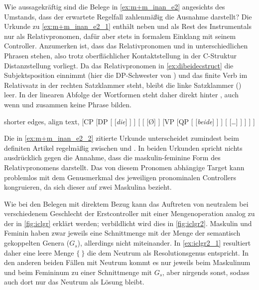 Wie aussagekräftig sind die Belege in \cref{ex:m+m_inan_e2} angesichts des
Umstands, dass der erwartete Regelfall zahlenmäßig die Ausnahme darstellt? Die
Urkunde zu \cref{ex:m+m_inan_e2_1} enthält neben   und   \autocite[\pno~2401,
487.11, 17]{cao3} als Rest des Instrumentals \autocite[vgl.][618]{ksw2} nur
 als Relativpronomen, dafür aber stets in formalem Einklang mit
seinem Controller. Anzumerken ist, dass das Relativpronomen und
 in unterschiedlichen Phrasen stehen, also trotz
oberflächlicher Kontaktstellung in der C-Struktur Distanzstellung vorliegt. Da
das Relativpronomen in \cref{ex:dibeidecstruct} die Subjektsposition einnimmt
(hier die DP-Schwester von ) und das finite Verb im Relativsatz in der
rechten Satzklammer steht, bleibt die linke Satzklammer () leer. In
der linearen Abfolge der Wortformen steht daher  direkt hinter
, auch wenn  und  zusammen keine Phrase bilden.

\begin{exe}
\ex \label{ex:dibeidecstruct}
	\begin{forest} shorter edges, align text,
	[CP
		[DP
			[
				[\textit{die}]
			]
		]
		[
			[
				[Ø]
			]
			[VP
				[QP
					[
						[\textit{beide}]
					]
				]
				[
					[\dots]
				]
			]
		]
	]
	\end{forest}
\end{exe}

Die in \cref{ex:m+m_inan_e2_2} zitierte Urkunde unterscheidet zumindest beim
definiten Artikel regelmäßig zwischen  und . In beiden
Urkunden spricht nichts ausdrücklich gegen die Annahme, dass  die maskulin-feminine Form des Relativpronomens darstellt. Das
von diesem Pronomen abhängige Target  kann problemlos mit dem
Genusmerkmal des jeweiligen pronominalen Controllers kongruieren, da sich
dieser auf zwei Maskulina bezieht.

Wie bei den Belegen mit direktem Bezug kann das Auftreten von neutralem
 bei verschiedenem Geschlecht der Erstcontroller mit einer
Mengenoperation analog zu der in \cref{fig:iclgr} erklärt werden; verbildlicht
wird dies in \cref{fig:iclgr2}. Maskulin und Feminin haben zwar jeweils eine
Schnittmenge mit der Menge der semantisch gekoppelten Genera ($G_s$),
allerdings nicht miteinander. In \cref{ex:iclgr2_1} resultiert daher eine leere
Menge $\{\ \}$ die dem Neutrum als Resolutionsgenus entspricht. In den anderen
beiden Fällen mit Neutrum  kommt es nur
jeweils beim Maskulinum und beim Femininum zu einer Schnittmenge mit $G_s$,
aber nirgends sonst, sodass auch dort nur das Neutrum als Lösung bleibt.


